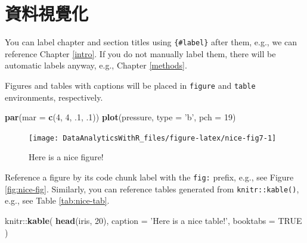 \documentclass[]{book}
\newenvironment{Shaded}{\begin{snugshade}}{\end{snugshade}}
\newcommand{\KeywordTok}[1]{\textcolor[rgb]{0.13,0.29,0.53}{\textbf{{#1}}}}
\newcommand{\DataTypeTok}[1]{\textcolor[rgb]{0.13,0.29,0.53}{{#1}}}
\newcommand{\DecValTok}[1]{\textcolor[rgb]{0.00,0.00,0.81}{{#1}}}
\newcommand{\StringTok}[1]{\textcolor[rgb]{0.31,0.60,0.02}{{#1}}}
\newcommand{\OtherTok}[1]{\textcolor[rgb]{0.56,0.35,0.01}{{#1}}}
\newcommand{\NormalTok}[1]{{#1}}
\theoremstyle{definition}
\theoremstyle{definition}
\theoremstyle{remark}
\begin{document}
\chapter{資料視覺化}\label{vis}

You can label chapter and section titles using \texttt{\{\#label\}}
after them, e.g., we can reference Chapter \ref{intro}. If you do not
manually label them, there will be automatic labels anyway, e.g.,
Chapter \ref{methods}.

Figures and tables with captions will be placed in \texttt{figure} and
\texttt{table} environments, respectively.

\begin{Shaded}
\begin{Highlighting}[]
\KeywordTok{par}\NormalTok{(}\DataTypeTok{mar =} \KeywordTok{c}\NormalTok{(}\DecValTok{4}\NormalTok{, }\DecValTok{4}\NormalTok{, .}\DecValTok{1}\NormalTok{, .}\DecValTok{1}\NormalTok{))}
\KeywordTok{plot}\NormalTok{(pressure, }\DataTypeTok{type =} \StringTok{'b'}\NormalTok{, }\DataTypeTok{pch =} \DecValTok{19}\NormalTok{)}
\end{Highlighting}
\end{Shaded}

\begin{figure}

{\centering \texttt{[image: DataAnalyticsWithR\_files/figure-latex/nice-fig7-1]} 

}

\caption{Here is a nice figure!}\label{fig:nice-fig7}
\end{figure}

Reference a figure by its code chunk label with the \texttt{fig:}
prefix, e.g., see Figure \ref{fig:nice-fig}. Similarly, you can
reference tables generated from \texttt{knitr::kable()}, e.g., see Table
\ref{tab:nice-tab}.

\begin{Shaded}
\begin{Highlighting}[]
\NormalTok{knitr::}\KeywordTok{kable}\NormalTok{(}
  \KeywordTok{head}\NormalTok{(iris, }\DecValTok{20}\NormalTok{), }\DataTypeTok{caption =} \StringTok{'Here is a nice table!'}\NormalTok{,}
  \DataTypeTok{booktabs =} \OtherTok{TRUE}
\NormalTok{)}
\end{Highlighting}
\end{Shaded}
\end{document}
